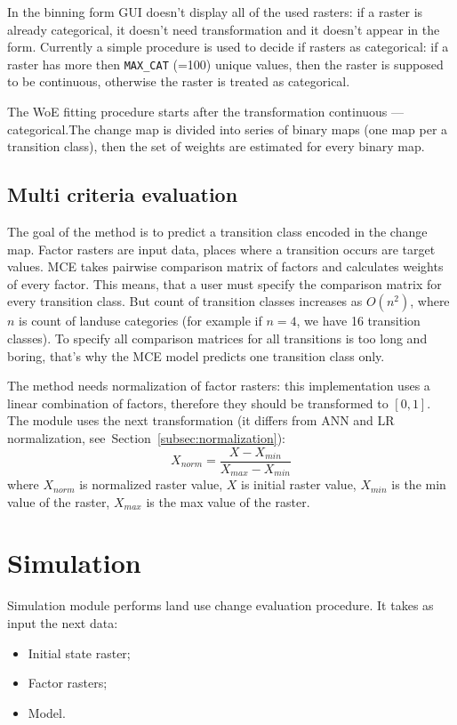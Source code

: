 \documentclass{report}
\begin{document}
In the binning form GUI doesn't display all of the used rasters: if a raster is already categorical, it doesn't need transformation and it doesn't appear in the form. Currently a simple procedure is used to decide if rasters as categorical: if a raster has more then \verb+MAX_CAT+ (=100) unique values, then the raster is supposed to be continuous, otherwise the raster is treated as categorical.

The WoE fitting procedure starts after the transformation continuous --- categorical.The change map is divided into series of binary maps (one map per a transition class), then the set of weights are estimated for every binary map. 

\subsection{Multi criteria evaluation}\label{subsec:MCE}

The goal of the method is to predict a transition class encoded in the change map. Factor rasters are input data, places where a transition occurs are target values. MCE takes pairwise comparison matrix of factors and calculates weights of every factor. This means, that a user must specify the comparison matrix for every transition class. But count of transition classes increases as $O(n^{2})$, where $n$ is count of landuse categories (for example if $n=4$, we have 16 transition classes). To specify all comparison matrices for all transitions is too long and boring, that's why the MCE model predicts one transition class only.

The method needs normalization of factor rasters: this implementation uses a linear combination of factors, therefore they should be transformed to $[0,1]$. The module uses the next transformation (it differs from ANN and LR normalization, see~Section~\ref{subsec:normalization}):
$$
X_{norm} = \frac{X-X_{min}}{X_{max} - X_{min}}
$$
where $X_{norm}$ is normalized raster value, $X$ is initial raster value, $X_{min}$ is the min value of the raster, $X_{max}$ is the max value of the raster. 

\section{Simulation}\label{sec:simulation}

Simulation module performs land use change evaluation procedure. It takes as input the next data:
\begin{itemize}
    \item Initial state raster;
    \item Factor rasters;
    \item Model.
\end{itemize}
\end{document}
